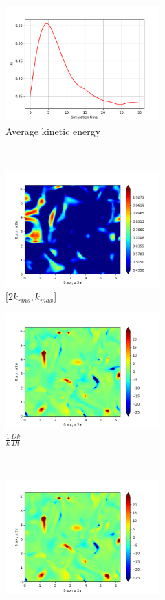 \begin{figure}[H]
    \begin{subfigure}[H]{0.45\textwidth}
        \includegraphics[height=1.75in]{media/run-cds-65/ke-average1335.png}
        \caption{Average kinetic energy}
    \end{subfigure}
    ~
    \begin{subfigure}[H]{0.45\textwidth}
        \includegraphics[height=1.75in]{media/run-cds-65/ke-2-1335.png}
        \caption{$[2k_{rms}, k_{max} $] }
    \end{subfigure}
    \newline
    \begin{subfigure}[H]{0.45\textwidth}
        \includegraphics[height=1.75in]{media/run-cds-65/ke-1335.png}
        \caption{$\frac{1}{k} \frac{D k}{Dt}$}
    \end{subfigure}
    ~
    \begin{subfigure}{0.45\textwidth}
        \includegraphics[height=1.75in]{media/run-cds-65/A-ke-1335.png}

\end{subfigure}
\end{figure}
